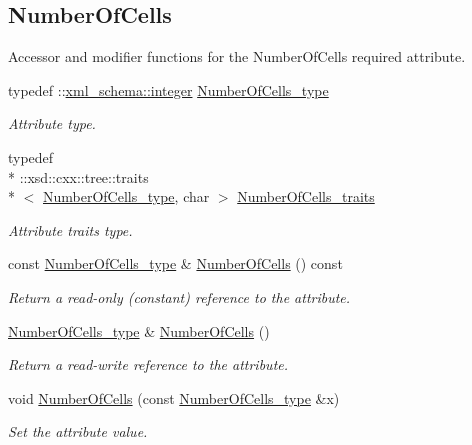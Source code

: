 \subsection*{Number\+Of\+Cells}
\label{_amgrp967ac3c5aad15a640629bb3adc1fc287}%
Accessor and modifier functions for the Number\+Of\+Cells required attribute. \begin{DoxyCompactItemize}
\item 
typedef \+::\hyperlink{namespacexml__schema_aaaea7c8ce4dfbe26cc52c91c29c97b7c}{xml\+\_\+schema\+::integer} \hyperlink{classPieceUnstructuredGrid__t_aeae5546900c50a4abe9b3aea485e97d0}{Number\+Of\+Cells\+\_\+type}
\begin{DoxyCompactList}\small\item\em Attribute type. \end{DoxyCompactList}\item 
typedef \\*
\+::xsd\+::cxx\+::tree\+::traits\\*
$<$ \hyperlink{classPieceUnstructuredGrid__t_aeae5546900c50a4abe9b3aea485e97d0}{Number\+Of\+Cells\+\_\+type}, char $>$ \hyperlink{classPieceUnstructuredGrid__t_a7c7607d306bde9e187b9cb3f570d6155}{Number\+Of\+Cells\+\_\+traits}
\begin{DoxyCompactList}\small\item\em Attribute traits type. \end{DoxyCompactList}\item 
const \hyperlink{classPieceUnstructuredGrid__t_aeae5546900c50a4abe9b3aea485e97d0}{Number\+Of\+Cells\+\_\+type} \& \hyperlink{classPieceUnstructuredGrid__t_a6e395db39208cc81f9d7093c50d5d334}{Number\+Of\+Cells} () const 
\begin{DoxyCompactList}\small\item\em Return a read-\/only (constant) reference to the attribute. \end{DoxyCompactList}\item 
\hyperlink{classPieceUnstructuredGrid__t_aeae5546900c50a4abe9b3aea485e97d0}{Number\+Of\+Cells\+\_\+type} \& \hyperlink{classPieceUnstructuredGrid__t_abe5f21a859d968d4b23a9b7ad790a7b3}{Number\+Of\+Cells} ()
\begin{DoxyCompactList}\small\item\em Return a read-\/write reference to the attribute. \end{DoxyCompactList}\item 
void \hyperlink{classPieceUnstructuredGrid__t_a25296cecd9f9c30f8c75ed8b750c1ad7}{Number\+Of\+Cells} (const \hyperlink{classPieceUnstructuredGrid__t_aeae5546900c50a4abe9b3aea485e97d0}{Number\+Of\+Cells\+\_\+type} \&x)
\begin{DoxyCompactList}\small\item\em Set the attribute value. \end{DoxyCompactList}\end{DoxyCompactItemize}
